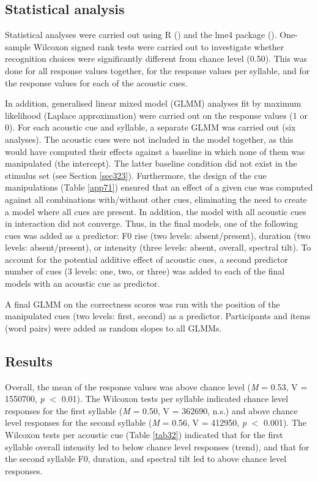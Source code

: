 \subsection{Statistical analysis} \label{sec326}
Statistical analyses were carried out using R (\citealt{rcoreteam_project_2019}) and the lme4 package (\citealt{bates_fitting_2015}). One-sample Wilcoxon signed rank tests were carried out to investigate whether recognition choices were significantly different from chance level (0.50). This was done for all response values together, for the response values per syllable, and for the response values for each of the acoustic cues.

In addition, generalised linear mixed model (GLMM) analyses fit by maximum likelihood (Laplace approximation) were carried out on the response values (1 or 0). For each acoustic cue and syllable, a separate GLMM was carried out (six analyses). The acoustic cues were not included in the model together, as this would have computed their effects against a baseline in which none of them was manipulated (the intercept). The latter baseline condition did not exist in the stimulus set (see Section \ref{sec323}). Furthermore, the design of the cue manipulations (Table \ref{app71}) ensured that an effect of a given cue was computed against all combinations with/without other cues, eliminating the need to create a model where all cues are present. In addition, the model with all acoustic cues in interaction did not converge. Thus, in the final models, one of the following cues was added as a predictor: F0 rise (two levels: absent/present), duration (two levels: absent/present), or intensity (three levels: absent, overall, spectral tilt). To account for the potential additive effect of acoustic cues, a second predictor number of cues (3 levels: one, two, or three) was added to each of the final models with an acoustic cue as predictor.

A final GLMM on the correctness scores was run with the position of the manipulated cues (two levels: first, second) as a predictor. Participants and items (word pairs) were added as random slopes to all GLMMs.

\subsection{Results}
Overall, the mean of the response values was above chance level (\textit{M} = 0.53, V = 1550700, \textit{p} $<$ 0.01). The Wilcoxon tests per syllable indicated chance level responses for the first syllable (\textit{M} = 0.50, V = 362690, n.s.) and above chance level responses for the second syllable (\textit{M} = 0.56, V = 412950, \textit{p} $<$ 0.001). The Wilcoxon tests per acoustic cue (Table \ref{tab32}) indicated that for the first syllable overall intensity led to below chance level responses (trend), and that for the second syllable F0, duration, and spectral tilt led to above chance level responses.

